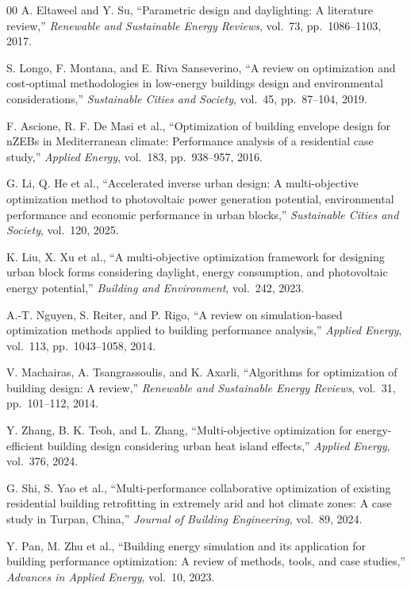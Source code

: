 \begin{thebibliography}{00}
A. Eltaweel and Y. Su, ``Parametric design and daylighting: A literature review,'' \emph{Renewable and Sustainable Energy Reviews}, vol.~73, pp.~1086--1103, 2017.

S. Longo, F. Montana, and E. Riva Sanseverino, ``A review on optimization and cost-optimal methodologies in low-energy buildings design and environmental considerations,'' \emph{Sustainable Cities and Society}, vol.~45, pp.~87--104, 2019.

F. Ascione, R. F. De Masi et al., ``Optimization of building envelope design for nZEBs in Mediterranean climate: Performance analysis of a residential case study,'' \emph{Applied Energy}, vol.~183, pp.~938--957, 2016.

G. Li, Q. He et al., ``Accelerated inverse urban design: A multi-objective optimization method to photovoltaic power generation potential, environmental performance and economic performance in urban blocks,'' \emph{Sustainable Cities and Society}, vol.~120, 2025.

K. Liu, X. Xu et al., ``A multi-objective optimization framework for designing urban block forms considering daylight, energy consumption, and photovoltaic energy potential,'' \emph{Building and Environment}, vol.~242, 2023.

A.-T. Nguyen, S. Reiter, and P. Rigo, ``A review on simulation-based optimization methods applied to building performance analysis,'' \emph{Applied Energy}, vol.~113, pp.~1043--1058, 2014.

V. Machairas, A. Tsangrassoulis, and K. Axarli, ``Algorithms for optimization of building design: A review,'' \emph{Renewable and Sustainable Energy Reviews}, vol.~31, pp.~101--112, 2014.

Y. Zhang, B. K. Teoh, and L. Zhang, ``Multi-objective optimization for energy-efficient building design considering urban heat island effects,'' \emph{Applied Energy}, vol.~376, 2024.

G. Shi, S. Yao et al., ``Multi-performance collaborative optimization of existing residential building retrofitting in extremely arid and hot climate zones: A case study in Turpan, China,'' \emph{Journal of Building Engineering}, vol.~89, 2024.

Y. Pan, M. Zhu et al., ``Building energy simulation and its application for building performance optimization: A review of methods, tools, and case studies,'' \emph{Advances in Applied Energy}, vol.~10, 2023.


\end{thebibliography}
